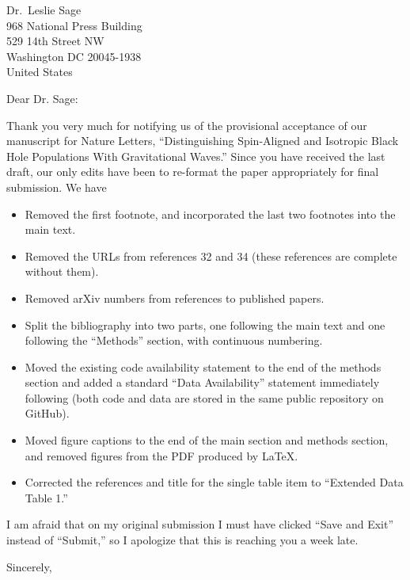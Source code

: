 \documentclass{letter}
\begin{document}
\begin{letter}{Dr.\ Leslie Sage\\968 National Press Building\\529 14th Street NW\\Washington DC 20045-1938\\United States}

\opening{Dear Dr. Sage:}

Thank you very much for notifying us of the provisional acceptance of
our manuscript for Nature Letters, ``Distinguishing Spin-Aligned and
Isotropic Black Hole Populations With Gravitational Waves.''  Since
you have received the last draft, our only edits have been to
re-format the paper appropriately for final submission.  We have 
\begin{itemize}
\item Removed the first footnote, and incorporated the last two
  footnotes into the main text.
\item Removed the URLs from references 32 and 34 (these references are
  complete without them).
\item Removed arXiv numbers from references to published papers.
\item Split the bibliography into two parts, one following the main
  text and one following the ``Methods'' section, with continuous
  numbering.
\item Moved the existing code availability statement to the end of the
  methods section and added a standard ``Data Availability'' statement
  immediately following (both code and data are stored in the same
  public repository on GitHub).
\item Moved figure captions to the end of the main section and methods
  section, and removed figures from the PDF produced by \LaTeX{}.
\item Corrected the references and title for the single table item to
  ``Extended Data Table 1.''
\end{itemize}

I am afraid that on my original submission I must have clicked ``Save
and Exit'' instead of ``Submit,'' so I apologize that this is reaching
you a week late.

\closing{Sincerely,}

\end{letter}
\end{document}
